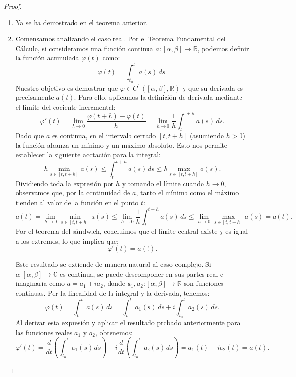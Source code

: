 \begin{proof}
    \leavevmode
    \begin{enumerate}
        \item[$(1) \implies (2)$] Ya se ha demostrado en el teorema anterior.
        \item[$(2) \implies (1)$] 
        
        Comenzamos analizando el caso real. Por el Teorema Fundamental del Cálculo, si consideramos una función continua $a : [\alpha, \beta] \to \mathbb{R}$, podemos definir la función acumulada $\varphi(t)$ como:
        \[
            \varphi (t) = \int_{t_0}^{t} a(s) \, ds.
        \]
        Nuestro objetivo es demostrar que $\varphi \in C^1([\alpha, \beta], \mathbb{R})$ y que su derivada es precisamente $a(t)$. Para ello, aplicamos la definición de derivada mediante el límite del cociente incremental:
        \[
            \varphi'(t) = \lim_{h \to 0} \frac{\varphi(t+h) - \varphi(t)}{h} = \lim_{h \to 0} \frac{1}{h} \int_{t}^{t+h} a(s) \, ds.
        \]
        Dado que $a$ es continua, en el intervalo cerrado $[t, t+h]$ (asumiendo $h>0$) la función alcanza un mínimo y un máximo absoluto. Esto nos permite establecer la siguiente acotación para la integral:
        \[
            h \min_{s \in [t, t+h]} a(s) \leq \int_{t}^{t+h} a(s) \, ds \leq h \max_{s \in [t, t+h]} a(s).
        \]
        Dividiendo toda la expresión por $h$ y tomando el límite cuando $h \to 0$, observamos que, por la continuidad de $a$, tanto el mínimo como el máximo tienden al valor de la función en el punto $t$:
        \[
            a(t) = \lim_{h \to 0} \min_{s \in [t, t+h]} a(s) \leq \lim_{h \to 0} \frac{1}{h} \int_{t}^{t+h} a(s) \, ds \leq \lim_{h \to 0} \max_{s \in [t, t+h]} a(s) = a(t).
        \]
        Por el teorema del sándwich, concluimos que el límite central existe y es igual a los extremos, lo que implica que:
        \[
            \varphi'(t) = a(t).
        \]

        Este resultado se extiende de manera natural al caso complejo. Si $a : [\alpha, \beta] \to \mathbb{C}$ es continua, se puede descomponer en sus partes real e imaginaria como $a = a_1 + i a_2$, donde $a_1, a_2 : [\alpha, \beta] \to \mathbb{R}$ son funciones continuas. Por la linealidad de la integral y la derivada, tenemos:
        \[
            \varphi(t) = \int_{t_0}^{t} a(s) \, ds = \int_{t_0}^{t} a_1(s) \, ds + i \int_{t_0}^{t} a_2(s) \, ds.
        \]
        Al derivar esta expresión y aplicar el resultado probado anteriormente para las funciones reales $a_1$ y $a_2$, obtenemos:
        \[
            \varphi'(t) = \frac{d}{dt} \left( \int_{t_0}^{t} a_1(s) \, ds \right) + i \frac{d}{dt} \left( \int_{t_0}^{t} a_2(s) \, ds \right) = a_1(t) + i a_2(t) = a(t).
        \]


\end{enumerate}
\end{proof}
